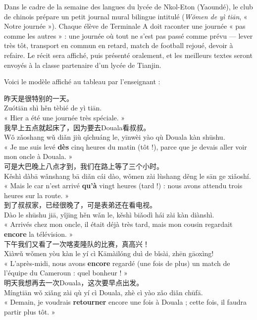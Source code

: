 \documentclass[11pt]{article}
\newcommand{\cle}[1]{{\popxbold\color{popdark}#1}}
\newcounter{popsec}
\newcounter{popsub}
\newcommand{\courssub}[1]{%
  \stepcounter{popsub}%
  \par\vspace{9pt}\noindent{\popxbold\fontsize{11.5}{13}\selectfont\color{popink}{\color{poporange}\thepopsec.\thepopsub}\hspace{6pt}#1}\par\nopagebreak\vspace{4pt}
}
\newcommand{\zh}[1]{\ifmmode\text{#1}\else{#1}\fi}
\begin{document}
\courssub{Situation}

Dans le cadre de la semaine des langues du lycée de Nkol-Eton (Yaoundé), le club de chinois prépare un petit journal mural bilingue intitulé \zh{我们的一天} (\emph{Wǒmen de yì tiān}, « Notre journée »). Chaque élève de Terminale A doit raconter une journée « pas comme les autres » : une journée où tout ne s'est pas passé comme prévu — lever très tôt, transport en commun en retard, match de football rejoué, devoir à refaire. Le récit sera affiché, puis présenté oralement, et les meilleurs textes seront envoyés à la classe partenaire d'un lycée de Tianjin.

Voici le modèle affiché au tableau par l'enseignant :

\begin{textebox}
昨天是很特别的一天。\\
Zuótiān shì hěn tèbié de yì tiān.\\
« Hier a été une journée très spéciale. »\\[4pt]
我早上五点\cle{就}起床了，因为要去Douala看叔叔。\\
Wǒ zǎoshang wǔ diǎn \cle{jiù} qǐchuáng le, yīnwèi yào qù Douala kàn shūshu.\\
« Je me suis levé \textbf{dès} cinq heures du matin (tôt !), parce que je devais aller voir mon oncle à Douala. »\\[4pt]
可是大巴晚上八点\cle{才}到，我们在路上等了三个小时。\\
Kěshì dàbā wǎnshang bā diǎn \cle{cái} dào, wǒmen zài lùshang děng le sān ge xiǎoshí.\\
« Mais le car n'est arrivé \textbf{qu'à} vingt heures (tard !) : nous avons attendu trois heures sur la route. »\\[4pt]
到了叔叔家，已经很晚了，可是表弟\cle{还}在看电视。\\
Dào le shūshu jiā, yǐjīng hěn wǎn le, kěshì biǎodì \cle{hái} zài kàn diànshì.\\
« Arrivés chez mon oncle, il était déjà très tard, mais mon cousin regardait \textbf{encore} la télévision. »\\[4pt]
下午我们\cle{又}看了一次喀麦隆队的比赛，真高兴！\\
Xiàwǔ wǒmen \cle{yòu} kàn le yí cì Kāmàilóng duì de bǐsài, zhēn gāoxìng!\\
« L'après-midi, nous avons \textbf{encore} regardé (une fois de plus) un match de l'équipe du Cameroun : quel bonheur ! »\\[4pt]
明天我想\cle{再}去一次Douala，这次要早点出发。\\
Míngtiān wǒ xiǎng \cle{zài} qù yí cì Douala, zhè cì yào zǎo diǎn chūfā.\\
« Demain, je voudrais \textbf{retourner} encore une fois à Douala ; cette fois, il faudra partir plus tôt. »
\end{textebox}
\end{document}
